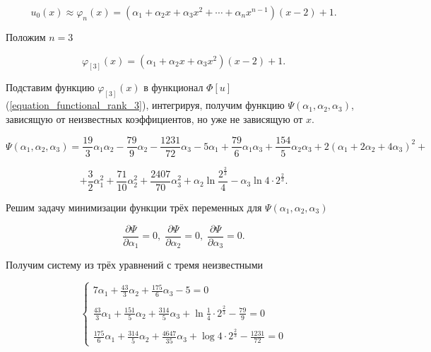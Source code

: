 \begin{displaymath}
	u_{0}(x) \approx \varphi_{n}(x) = (\alpha_{1} + \alpha_{2}x + \alpha_{3}x^2 + \cdots + \alpha_{n}x^{n-1})(x-2)+1.
\end{displaymath}

\noindent Положим $n = 3$

\begin{displaymath}
	\varphi_{[3]}(x) = (\alpha_{1} + \alpha_{2}x + \alpha_{3}x^2)(x-2)+1.
\end{displaymath}

\noindent Подставим функцию $\varphi_{[3]}(x)$ в функционал $\Phi[u]$ (\ref{equation_functional_rank_3}), интегрируя, получим функцию $\Psi(\alpha_{1}, \alpha_{2}, \alpha_{3})$, зависящую от неизвестных коэффициентов, но уже не зависящую от $x$.

\begin{displaymath}
	\Psi(\alpha_{1}, \alpha_{2}, \alpha_{3}) = \frac{19}{3}\alpha_{1}\alpha_{2} - \frac{79}{9}\alpha_{2} - \frac{1231}{72}\alpha_{3} - 5\alpha_{1} + \frac{79}{6}\alpha_{1}\alpha_{3} + \frac{154}{5}\alpha_{2}\alpha_{3} + 2(\alpha_{1} + 2 \alpha_{2} + 4\alpha_{3})^2 +
\end{displaymath}
	
\begin{displaymath}	
	 + \frac{3}{2}\alpha_{1}^{2} +  \frac{71}{10}\alpha_{2}^{2} + \frac{2407}{70}\alpha_{3}^{2} + \alpha_{2} \ln{\frac{2^{\frac{2}{3}}}{4}} - \alpha_{3} \ln{4 \cdot 2^{\frac{2}{3}}}.
\end{displaymath}

\noindent Решим задачу минимизации функции трёх переменных для $\Psi(\alpha_{1}, \alpha_{2}, \alpha_{3})$

\begin{displaymath}
	\frac{\partial \Psi}{\partial \alpha_{1}} = 0, \;
	\frac{\partial \Psi}{\partial \alpha_{2}} = 0, \;
	\frac{\partial \Psi}{\partial \alpha_{3}} = 0.
\end{displaymath}

\noindent Получим систему из трёх уравнений с тремя неизвестными

\begin{displaymath}
	\begin{cases}
		7\alpha_{1} + \frac{43}{3}\alpha_{2} + \frac{175}{6}\alpha_{3} - 5 = 0 \\
		\\
		\frac{43}{3}\alpha_{1} + \frac{151}{5}\alpha_{2} + \frac{314}{5}\alpha_{3} + \ln{\frac{1}{4} \cdot 2^{\frac{2}{3}}} - \frac{79}{9} = 0 \\
		\\
		\frac{175}{6}\alpha_{1} + \frac{314}{5}\alpha_{2} + \frac{4647}{35}\alpha_{3} + \log{4 \cdot 2^{\frac{2}{3}}} - \frac{1231}{72} = 0
	\end{cases}
\end{displaymath}

